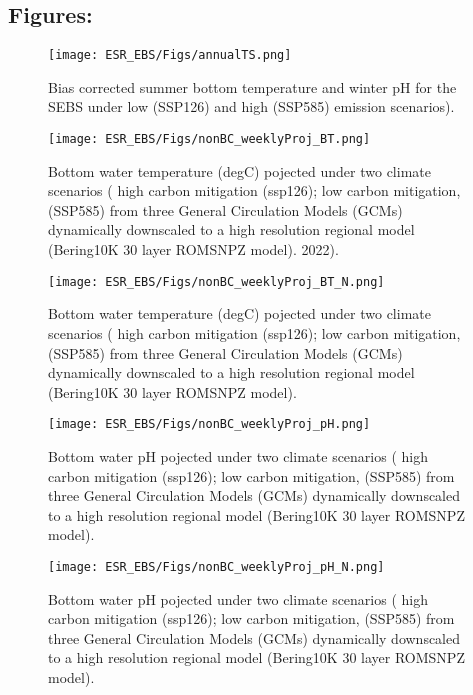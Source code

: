 \documentclass[
]{article}
\begin{document}
\hypertarget{figures}{%
\subsection{Figures:}\label{figures}}

\begin{figure}
\centering
\texttt{[image: ESR\_EBS/Figs/annualTS.png]}
\caption{Bias corrected summer bottom temperature and winter pH for the
SEBS under low (SSP126) and high (SSP585) emission scenarios).}
\end{figure}

\begin{figure}
\centering
\texttt{[image: ESR\_EBS/Figs/nonBC\_weeklyProj\_BT.png]}
\caption{Bottom water temperature (degC) pojected under two climate
scenarios ( high carbon mitigation (ssp126); low carbon mitigation,
(SSP585) from three General Circulation Models (GCMs) dynamically
downscaled to a high resolution regional model (Bering10K 30 layer
ROMSNPZ model). 2022).}
\end{figure}

\begin{figure}
\centering
\texttt{[image: ESR\_EBS/Figs/nonBC\_weeklyProj\_BT\_N.png]}
\caption{Bottom water temperature (degC) pojected under two climate
scenarios ( high carbon mitigation (ssp126); low carbon mitigation,
(SSP585) from three General Circulation Models (GCMs) dynamically
downscaled to a high resolution regional model (Bering10K 30 layer
ROMSNPZ model).}
\end{figure}

\begin{figure}
\centering
\texttt{[image: ESR\_EBS/Figs/nonBC\_weeklyProj\_pH.png]}
\caption{Bottom water pH pojected under two climate scenarios ( high
carbon mitigation (ssp126); low carbon mitigation, (SSP585) from three
General Circulation Models (GCMs) dynamically downscaled to a high
resolution regional model (Bering10K 30 layer ROMSNPZ model).}
\end{figure}

\begin{figure}
\centering
\texttt{[image: ESR\_EBS/Figs/nonBC\_weeklyProj\_pH\_N.png]}
\caption{Bottom water pH pojected under two climate scenarios ( high
carbon mitigation (ssp126); low carbon mitigation, (SSP585) from three
General Circulation Models (GCMs) dynamically downscaled to a high
resolution regional model (Bering10K 30 layer ROMSNPZ model).}
\end{figure}
\end{document}
